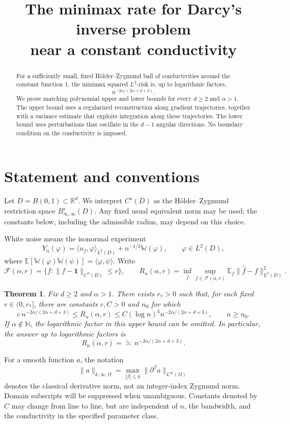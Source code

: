 \documentclass[11pt]{article}
\title{The minimax rate for Darcy's inverse problem\\
near a constant conductivity}
\author{}
\date{}
\newtheorem{theorem}{Theorem}[section]
\theoremstyle{remark}
\newcommand{\R}{\mathbb R}
\newcommand{\E}{\mathbb E}
\newcommand{\one}{\mathbf 1}
\newcommand{\cF}{\mathcal F}
\begin{document}
\maketitle

\begin{abstract}
For a sufficiently small, fixed H\"older--Zygmund ball of conductivities
around the constant function \(1\), the minimax squared \(L^2\)-risk is,
up to logarithmic factors,
\[
n^{-2\alpha/(2\alpha+d+3)}.
\]
We prove matching polynomial upper and lower bounds for every \(d\geq2\)
and \(\alpha>1\). The upper bound uses a regularized reconstruction along
gradient trajectories, together with a variance estimate that exploits
integration along these trajectories. The lower bound uses perturbations
that oscillate in the \(d-1\) angular directions. No boundary condition
on the conductivity is imposed.
\end{abstract}

\section{Statement and conventions}

Let \(D=B(0,1)\subset\R^d\). We interpret \(C^s(D)\) as the
H\"older--Zygmund restriction space \(B^s_{\infty,\infty}(D)\).
Any fixed usual equivalent norm may be used; the constants below,
including the admissible radius, may depend on this choice.

White noise means the isonormal experiment
\[
Y_n(\varphi)=\langle u_f,\varphi\rangle_{L^2(D)}
+n^{-1/2}\mathbb W(\varphi),\qquad \varphi\in L^2(D),
\]
where
\(\E[\mathbb W(\varphi)\mathbb W(\psi)]=\langle\varphi,\psi\rangle\).
Write
\[
\cF(\alpha,r)=
\{f:\|f-\one\|_{C^\alpha(D)}\leq r\},
\qquad
R_n(\alpha,r)=
\inf_{\widehat f}\sup_{f\in\cF(\alpha,r)}
\E_f\|\widehat f-f\|_{L^2(D)}^2.
\]

\begin{theorem}\label{thm:main}
Fix \(d\geq2\) and \(\alpha>1\). There exists \(r_*>0\) such that,
for each fixed \(r\in(0,r_*]\), there are constants
\(c,C>0\) and \(n_0\) for which
\[
c\,n^{-2\alpha/(2\alpha+d+3)}
\leq R_n(\alpha,r)
\leq
C(\log n)^4 n^{-2\alpha/(2\alpha+d+3)},
\qquad n\geq n_0.
\]
If \(\alpha\notin\mathbb N\), the logarithmic factor in this upper bound
can be omitted. In particular, the answer up to logarithmic factors is
\[
\boxed{\displaystyle
R_n(\alpha,r)=\widetilde{\asymp}\,
n^{-2\alpha/(2\alpha+d+3)}.}
\]
\end{theorem}

For a smooth function \(a\), the notation
\[
\|a\|_{k,\infty;\Omega}
=\max_{|\beta|\leq k}\|\partial^\beta a\|_{L^\infty(\Omega)}
\]
denotes the classical derivative norm, not an integer-index Zygmund
norm. Domain subscripts will be suppressed when unambiguous.
Constants denoted by \(C\) may change from line to line, but are
independent of \(n\), the bandwidth, and the conductivity in the
specified parameter class.
\end{document}
